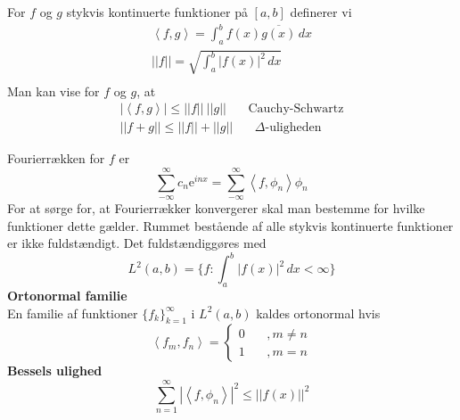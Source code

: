 \documentclass[12pt,a4paper,draft]{report}
\author{Frederik Appel Vardinghus-Nielsen}
\begin{document}
For $f$ og $g$ stykvis kontinuerte funktioner på $[a,b]$ definerer vi
\begin{align*}
\left<f,g\right>=\int_a^b\! f(x)\overline{g(x)}\,dx\\
||f||=\sqrt{\int_a^b \! |f(x)|^2\, dx}\\
\end{align*}
Man kan vise for $f$ og $g$, at
\begin{align*}
|\left<f,g\right>|\leq ||f|| \ ||g||\phantom{mm}\text{Cauchy-Schwartz}\\
||f+g||\leq ||f||+||g||\phantom{mm}\text{$\Delta$-uligheden}
\end{align*}

Fourierrækken for $f$ er
\begin{equation}
\sum_{-\infty}^{\infty}c_n\mathrm{e}^{inx}=\sum_{-\infty}^{\infty}\left<f,\phi_n\right>\phi_n
\end{equation}
For at sørge for, at Fourierrækker konvergerer skal man bestemme for hvilke funktioner dette gælder. Rummet bestående af alle stykvis kontinuerte funktioner er ikke fuldstændigt. Det fuldstændiggøres med
\begin{equation}
L^2(a,b)=\{f:\int_a^b\!|f(x)|^2\,dx<\infty\}
\end{equation}
\textbf{Ortonormal familie}\\
En familie af funktioner $\{f_k\}_{k=1}^{\infty}$ i $L^2(a,b)$ kaldes ortonormal hvis
\begin{equation}
\left<f_m,f_n\right>=\begin{cases}0\phantom{mm},m\neq n\\1\phantom{mm},m=n\end{cases}
\end{equation}
\textbf{Bessels ulighed}
\begin{equation}
\sum_{n=1}^{\infty}|\left<f,\phi_n\right>|^2\leq ||f(x)||^2
\end{equation}
\end{document}
